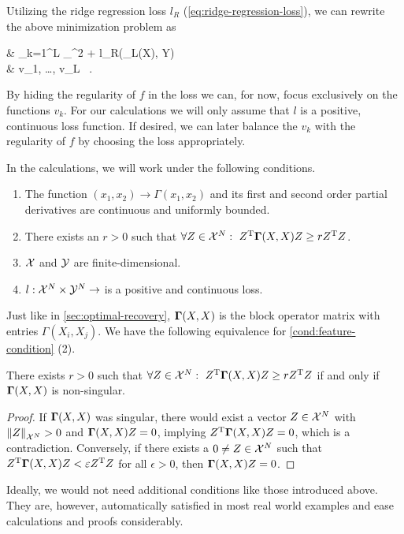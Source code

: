 Utilizing the ridge regression loss $l_R$ (\cref{eq:ridge-regression-loss}), we can rewrite the above minimization problem as
\begin{problem}
	\begin{cases}
		 & \nu \cdot {} \sum_{k=1}^{L} _\cV^2
		+ l_R(\Phi_L(X), Y) \\
		 & v_1, \ldots, v_L \in \cV\ .
	\end{cases}
\end{problem}
By hiding the regularity of $f$ in the loss we can, for now, focus exclusively on the functions $v_k$.
For our calculations we will only assume that $l$ is a positive, continuous loss function.
If desired, we can later balance the $v_k$ with the regularity of $f$ by choosing the loss appropriately.

In the calculations, we will work under the following conditions.
\begin{condition}
	\label{cond:feature-condition}\mbox{}
	\vspace*{-\parsep}
	\vspace*{-\baselineskip}
	\begin{enumerate}
		\item The function $(x_1, x_2) \rightarrow \Gamma(x_1, x_2)$ and its first and second order partial derivatives are continuous and uniformly bounded.
		\item There exists an $r > 0$ such that $\forall Z \in \mathcal{X}^N:~Z^{\mathrm{T}} \mathbf{\Gamma}(X, X) Z \geq r Z^{\mathrm{T}} Z$.
		\item $\mathcal{X}$ and $\mathcal{Y}$ are finite-dimensional.
		\item $l: \mathcal{X}^N \times \mathcal{Y}^N \rightarrow$ is a positive and continuous loss.
	\end{enumerate}
\end{condition}
Just like in \cref{sec:optimal-recovery}, $\mathbf{\Gamma}(X, X)$ is the block operator matrix with entries $\Gamma(X_i, X_j)$.
We have the following equivalence for \cref{cond:feature-condition} (2).
\begin{lemma}
	There exists $r > 0$ such that $\forall Z \in \mathcal{X}^N:~Z^{\mathrm{T}} \mathbf{\Gamma}(X, X) Z \geq r Z^{\mathrm{T}} Z$ if and only if $\mathbf{\Gamma}(X, X)$ is non-singular.
\end{lemma}
\begin{proof}
	If $\mathbf{\Gamma}(X, X)$ was singular, there would exist a vector $Z \in \mathcal{X}^N$ with $\norm{Z}_{\mathcal{X}^N} > 0$ and $\mathbf{\Gamma}(X, X) Z = 0$, implying $Z^{\mathrm{T}} \mathbf{\Gamma}(X, X)Z = 0$, which is a contradiction.
	Conversely, if there exists a $0 \neq Z \in \mathcal{X}^N$ such that $Z^{\mathrm{T}} \mathbf{\Gamma}(X, X) Z < \varepsilon Z^{\mathrm{T}} Z$ for all $\epsilon > 0$, then $\mathbf{\Gamma}(X, X) Z = 0$.
\end{proof}
Ideally, we would not need additional conditions like those introduced above.
They are, however, automatically satisfied in most real world examples and ease calculations and proofs considerably.

